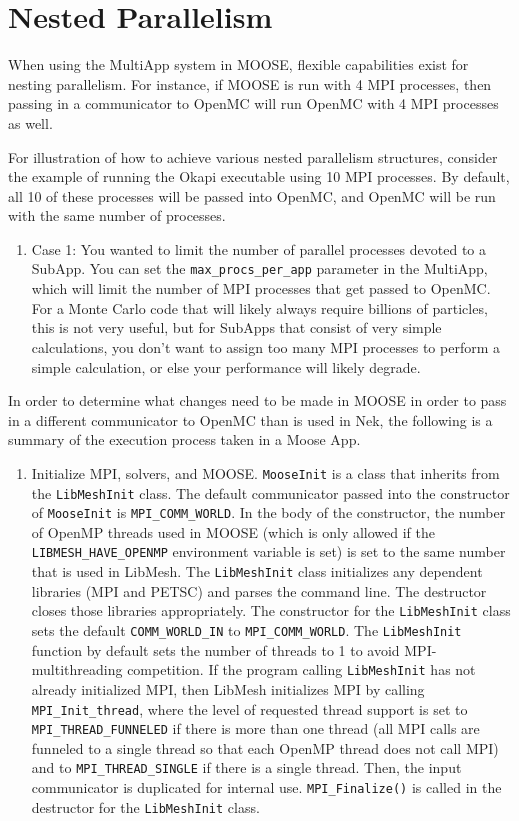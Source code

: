 \documentclass[10pt]{article}
\numberwithin{equation}{section} %
\begin{document}
\section{Nested Parallelism}
When using the MultiApp system in MOOSE, flexible capabilities exist for nesting parallelism. For instance, if MOOSE is run with 4 MPI processes, then passing in a communicator to OpenMC will run OpenMC with 4 MPI processes as well. 

For illustration of how to achieve various nested parallelism structures, consider the example of running the Okapi executable using 10 MPI processes. By default, all 10 of these processes will be passed into OpenMC, and OpenMC will be run with the same number of processes. 

\begin{enumerate}
\item Case 1: You wanted to limit the number of parallel processes devoted to a SubApp. You can set the {\tt max\_procs\_per\_app} parameter in the MultiApp, which will limit the number of MPI processes that get passed to OpenMC. For a Monte Carlo code that will likely always require billions of particles, this is not very useful, but for SubApps that consist of very simple calculations, you don't want to assign too many MPI processes to perform a simple calculation, or else your performance will likely degrade.
\end{enumerate} 

In order to determine what changes need to be made in MOOSE in order to pass in a different communicator to OpenMC than is used in Nek, the following is a summary of the execution process taken in a Moose App. 

\begin{enumerate}
\item Initialize MPI, solvers, and MOOSE. {\tt MooseInit} is a class that inherits from the {\tt LibMeshInit} class. The default communicator passed into the constructor of {\tt MooseInit} is {\tt MPI\_COMM\_WORLD}. In the body of the constructor, the number of OpenMP threads used in MOOSE (which is only allowed if the {\tt LIBMESH\_HAVE\_OPENMP} environment variable is set) is set to the same number that is used in LibMesh. The {\tt LibMeshInit} class initializes any dependent libraries (MPI and PETSC) and parses the command line. The destructor closes those libraries appropriately. The constructor for the {\tt LibMeshInit} class sets the default {\tt COMM\_WORLD\_IN} to {\tt MPI\_COMM\_WORLD}. The {\tt LibMeshInit} function by default sets the number of threads to 1 to avoid MPI-multithreading competition. If the program calling {\tt LibMeshInit} has not already initialized MPI, then LibMesh initializes MPI by calling {\tt MPI\_Init\_thread}, where the level of requested thread support is set to {\tt MPI\_THREAD\_FUNNELED} if there is more than one thread (all MPI calls are funneled to a single thread so that each OpenMP thread does not call MPI) and to {\tt MPI\_THREAD\_SINGLE} if there is a single thread. Then, the input communicator is duplicated for internal use. {\tt MPI\_Finalize()} is called in the destructor for the {\tt LibMeshInit} class. 
\end{enumerate}
\end{document}
